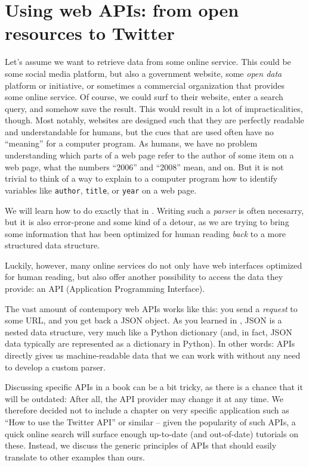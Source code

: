 \section{Using web APIs: from open resources to Twitter}
\label{sec:apis}


Let's assume we want to retrieve data from some online service. This
could be some social media platform, but also a government website,
some \emph{open data} platform or initiative, or sometimes a
commercial organization that provides some online service.  Of course,
we could surf to their website, enter a search query, and somehow save
the result. This would result in a lot of impracticalities,
though. Most notably, websites are designed such that they are
perfectly readable and understandable for humans, but the cues that
are used often have no ``meaning'' for a computer program. As humans,
we have no problem understanding which parts of a web page refer to
the author of some item on a web page, what the numbers ``2006'' and
``2008'' mean, and on. But it is not trivial to think of a way to
explain to a computer program how to identify variables like
\texttt{author}, \texttt{title}, or \texttt{year} on a web page.

We will learn how to do exactly that in . Writing
such a \emph{parser} is often necesarry, but it is also error-prone
and some kind of a detour, as we are trying to bring some information
that has been optimized for human reading \emph{back} to a more
structured data structure. 

Luckily, however, many online services do not only have web interfaces
optimized for human reading, but also offer another possibility to
access the data they provide: an API (Application Programming
Interface).

The vast amount of contempory web APIs works like this: you send a
\emph{request} to some URL, and you get back a JSON object. As you
learned in , JSON is a nested data structure, very
much like a Python dictionary (and, in fact, JSON data typically are
represented as a dictionary in Python). In other words: APIs directly
gives us machine-readable data that we can work with without any need
to develop a custom parser.

Discussing specific APIs in a book can be a bit tricky, as there is a
chance that it will be outdated: After all, the API provider may change
it at any time. We therefore decided not to include a chapter on very
specific application such as ``How to use the Twitter API'' or similar --
given the popularity of such APIs, a quick online search will surface
enough up-to-date (and out-of-date) tutorials on these. Instead,
we discuss the generic principles of APIs that should easily translate
to other examples than ours.


